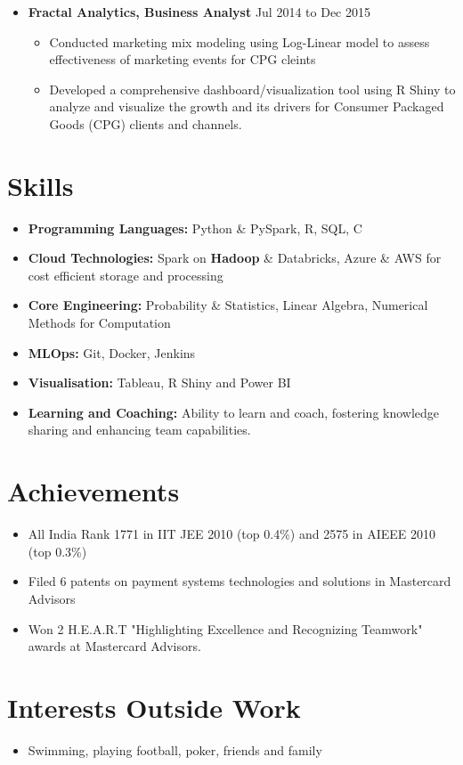 \documentclass[a4paper,10pt]{article}
\begin{document}
\begin{itemize}[leftmargin=0.2cm, label={}]
    \item \textbf{Fractal Analytics, Business Analyst} \hfill \textnormal{Jul 2014 to Dec 2015}
    \begin{itemize}[leftmargin=0.5cm, label={\textbullet}]
        \item Conducted marketing mix modeling using Log-Linear model to assess effectiveness of marketing events for CPG cleints 
        \item Developed a comprehensive dashboard/visualization tool using R Shiny to analyze and visualize the growth and its drivers for Consumer Packaged Goods (CPG) clients
        and channels.
    \end{itemize}
\end{itemize}

\section*{Skills}
\begin{itemize}[leftmargin=0.2cm, label={}]
    \item \textbf{Programming Languages:} Python \& PySpark, R, SQL, C
    \item \textbf{Cloud Technologies:} Spark on {\textbf{Hadoop}} \& Databricks, Azure \& AWS for cost efficient storage and processing
    \item \textbf{Core Engineering:} Probability \& Statistics, Linear Algebra, Numerical Methods for Computation
    \item \textbf{MLOps:} Git, Docker, Jenkins
    \item \textbf{Visualisation:} Tableau, R Shiny and Power BI
    \item \textbf{Learning and Coaching:} Ability to learn and coach, fostering knowledge sharing and enhancing team capabilities.
\end{itemize}

\section*{Achievements}
\begin{itemize}[leftmargin=0.2cm, label={}]
    \item All India Rank 1771 in IIT JEE 2010 (top 0.4\%) and 2575 in AIEEE 2010 (top 0.3\%)
    \item Filed 6 patents on payment systems technologies and solutions in Mastercard Advisors
    \item Won 2 H.E.A.R.T "Highlighting Excellence and Recognizing Teamwork" awards at Mastercard Advisors.
\end{itemize}

\section*{Interests Outside Work}
\begin{itemize}[leftmargin=0.2cm, label={}]
    \item Swimming, playing football, poker, friends and family
\end{itemize}
\end{document}
